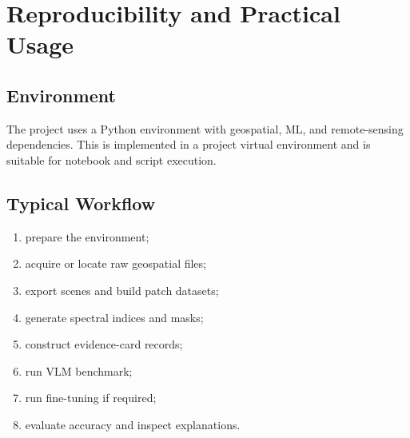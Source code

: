 \documentclass[11pt]{article}
\begin{document}
\section{Reproducibility and Practical Usage}

\subsection{Environment}
The project uses a Python environment with geospatial, ML, and remote-sensing dependencies. This is implemented in a project virtual environment and is suitable for notebook and script execution.

\subsection{Typical Workflow}
\begin{enumerate}
    \item prepare the environment;
    \item acquire or locate raw geospatial files;
    \item export scenes and build patch datasets;
    \item generate spectral indices and masks;
    \item construct evidence-card records;
    \item run VLM benchmark;
    \item run fine-tuning if required;
    \item evaluate accuracy and inspect explanations.
\end{enumerate}
\end{document}
